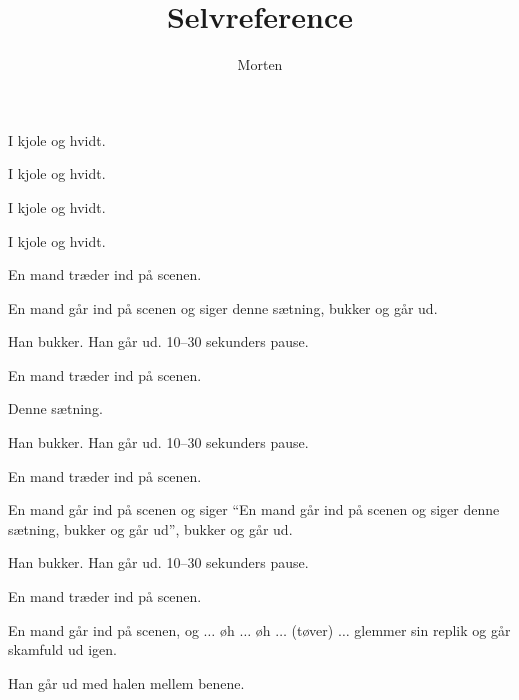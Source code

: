 \documentclass[a4paper,11pt]{article}
\title{Selvreference}
\author{Morten}
\begin{document}
\maketitle

\begin{roles}

 I kjole og hvidt.

 I kjole og hvidt.

 I kjole og hvidt.

 I kjole og hvidt.

\end{roles}

\scene En mand træder ind på scenen. 

\begin{sketch}

 En mand går ind på scenen og siger denne sætning,
bukker og går ud.

\scene Han bukker. Han går ud. 10--30 sekunders pause.

\scene En mand træder ind på scenen. 

 Denne sætning.

\scene Han bukker. Han går ud. 10--30 sekunders pause.

\scene En mand træder ind på scenen. 

En mand går ind på scenen og siger ``En mand går ind
på scenen og siger denne sætning, bukker og går ud'', bukker og
går ud.

\scene Han bukker. Han går ud. 10--30 sekunders pause.

\scene En mand træder ind på scenen.

 En mand går ind på scenen, og $\ldots$ øh $\ldots$
øh $\ldots$ (tøver) $\ldots$ glemmer sin replik og går skamfuld ud
igen. 

\scene Han går ud med halen mellem benene.

\end{sketch}
\end{document}
